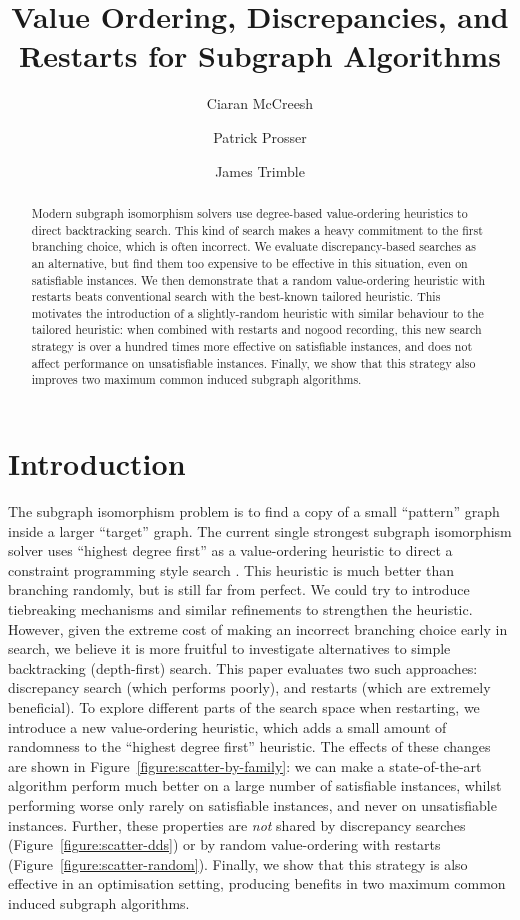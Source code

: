 \documentclass[a4paper,UKenglish]{lipics-v2018}
\title{Value Ordering, Discrepancies, and Restarts for Subgraph Algorithms}
\author{Ciaran McCreesh}{University of Glasgow}{ciaran.mccreesh@glasgow.ac.uk}{}{}
\author{Patrick Prosser}{University of Glasgow}{patrick.prosser@glasgow.ac.uk}{}{}
\author{James Trimble}{University of Glasgow}{j.trimble.1@research.gla.ac.uk}{}{}
\newcommand{\figureref}[1]{Figure~\ref{#1}}
\begin{document}
\maketitle

\begin{abstract}
    Modern subgraph isomorphism solvers use degree-based value-ordering heuristics to direct
    backtracking search. This kind of search makes a heavy commitment to the first branching choice,
    which is often incorrect. We evaluate discrepancy-based searches as an alternative, but find
    them too expensive to be effective in this situation, even on satisfiable instances. We then
    demonstrate that a random value-ordering heuristic with restarts beats conventional search with
    the best-known tailored heuristic. This motivates the introduction of a slightly-random
    heuristic with similar behaviour to the tailored heuristic: when combined with restarts and
    nogood recording, this new search strategy is over a hundred times more effective on satisfiable
    instances, and does not affect performance on unsatisfiable instances.  Finally, we show that
    this strategy also improves two maximum common induced subgraph algorithms.
\end{abstract}

\section{Introduction}

The subgraph isomorphism problem is to find a copy of a small ``pattern'' graph inside a larger
``target'' graph.  The current single strongest subgraph isomorphism solver uses ``highest degree
first'' as a value-ordering heuristic to direct a constraint programming style search
\cite{DBLP:conf/cp/McCreeshP15,DBLP:conf/lion/KotthoffMS16,DBLP:conf/ijcai/McCreeshPT16}. This
heuristic is much better than branching randomly, but is still far from perfect.  We could try to
introduce tiebreaking mechanisms and similar refinements to strengthen the heuristic. However, given
the extreme cost of making an incorrect branching choice early in search, we believe it is more
fruitful to investigate alternatives to simple backtracking (depth-first) search. This paper
evaluates two such approaches: discrepancy search (which performs poorly), and restarts (which are
extremely beneficial). To explore different parts of the search space when restarting, we introduce
a new value-ordering heuristic, which adds a small amount of randomness to the ``highest degree
first'' heuristic.  The effects of these changes are shown in
\figureref{figure:scatter-by-family}: we can make a state-of-the-art algorithm perform much better on a
large number of satisfiable instances, whilst performing worse only rarely on satisfiable instances,
and never on unsatisfiable instances.  Further, these properties are \emph{not} shared by
discrepancy searches (\figureref{figure:scatter-dds}) or by random value-ordering with restarts
(\figureref{figure:scatter-random}). Finally, we show that this strategy is also effective in an
optimisation setting, producing benefits in two maximum common induced subgraph algorithms.
\end{document}
